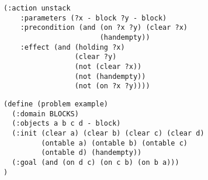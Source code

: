 \documentclass{gkibeamer}
\begin{document}
\begin{frame}[containsverbatim]
\begin{verbatim}
(:action unstack
    :parameters (?x - block ?y - block)
    :precondition (and (on ?x ?y) (clear ?x)
                       (handempty))
    :effect (and (holding ?x)
                 (clear ?y)
                 (not (clear ?x))
                 (not (handempty))
                 (not (on ?x ?y))))
\end{verbatim}
\end{frame}

\begin{frame}[containsverbatim]

\begin{verbatim}
(define (problem example)
  (:domain BLOCKS)
  (:objects a b c d - block)
  (:init (clear a) (clear b) (clear c) (clear d)
         (ontable a) (ontable b) (ontable c)
         (ontable d) (handempty))
  (:goal (and (on d c) (on c b) (on b a)))
)
\end{verbatim}
\end{frame}
\end{document}
